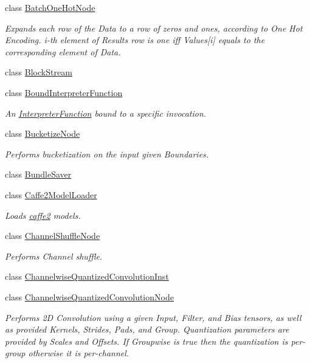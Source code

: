 \begin{DoxyCompactItemize}
class \hyperlink{classglow_1_1_batch_one_hot_node}{Batch\+One\+Hot\+Node}
\begin{DoxyCompactList}\small\item\em Expands each row of the Data to a row of zeros and ones, according to One Hot Encoding. i-\/th element of Result\textquotesingle{}s row is one iff Values\mbox{[}i\mbox{]} equals to the corresponding element of Data. \end{DoxyCompactList}\item 
class \hyperlink{classglow_1_1_block_stream}{Block\+Stream}
\item 
class \hyperlink{classglow_1_1_bound_interpreter_function}{Bound\+Interpreter\+Function}
\begin{DoxyCompactList}\small\item\em An \hyperlink{classglow_1_1_interpreter_function}{Interpreter\+Function} bound to a specific invocation. \end{DoxyCompactList}\item 
class \hyperlink{classglow_1_1_bucketize_node}{Bucketize\+Node}
\begin{DoxyCompactList}\small\item\em Performs bucketization on the input given Boundaries. \end{DoxyCompactList}\item 
class \hyperlink{classglow_1_1_bundle_saver}{Bundle\+Saver}
\item 
class \hyperlink{classglow_1_1_caffe2_model_loader}{Caffe2\+Model\+Loader}
\begin{DoxyCompactList}\small\item\em Loads \hyperlink{namespacecaffe2}{caffe2} models. \end{DoxyCompactList}\item 
class \hyperlink{classglow_1_1_channel_shuffle_node}{Channel\+Shuffle\+Node}
\begin{DoxyCompactList}\small\item\em Performs Channel shuffle. \end{DoxyCompactList}\item 
class \hyperlink{classglow_1_1_channelwise_quantized_convolution_inst}{Channelwise\+Quantized\+Convolution\+Inst}
\item 
class \hyperlink{classglow_1_1_channelwise_quantized_convolution_node}{Channelwise\+Quantized\+Convolution\+Node}
\begin{DoxyCompactList}\small\item\em Performs 2D Convolution using a given Input, Filter, and Bias tensors, as well as provided Kernels, Strides, Pads, and Group. Quantization parameters are provided by Scales and Offsets. If Groupwise is true then the quantization is per-\/group otherwise it is per-\/channel. \end{DoxyCompactList}\item 

\end{DoxyCompactItemize}
